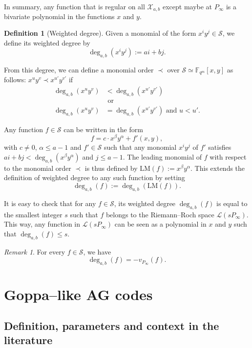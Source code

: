 \documentclass[lettersize,journal]{IEEEtran}
\theoremstyle{plain}
\theoremstyle{definition}
\newtheorem{definition}[thm]{Definition}
\theoremstyle{remark}
\newtheorem{remark}[thm]{Remark}
\newcommand{\calL}{\mathcal{L}}
\newcommand{\calS}{\mathcal{S}}
\newcommand{\calX}{\mathcal{X}}
\newcommand{\fqm}{\mathbb{F}_{q^m}}
\newcommand{\degab}[1]{\deg_{a,b}\left(#1\right)}
\begin{document}
	In summary, any function that is regular on all $\calX_{a,b}$ except maybe at $P_\infty$ is a bivariate polynomial in the functions $x$ and $y$. 
	
	\begin{definition}[Weighted degree] 
		Given a monomial of the form $x^iy^j \in \calS$, we define its weighted degree by
		\[ \degab{x^iy^j} := ai+bj.\]
		
		From this degree, we can define a monomial order $\prec$ over $\calS \simeq \fqm[x,y]$ as follows: $x^uy^v \prec x^{u'}y^{v'}$ if
		\begin{equation}\label{eq:def_mon_order}
			\begin{aligned}			
			\degab{x^uy^v} &< \degab{x^{u'}y^{v'}} \\
			&\text{ or }\\
			 \degab{x^uy^v} &= \degab{x^{u'}y^{v'}}  \text{ and } u < u'.
			 \end{aligned}
		\end{equation}
		
		Any function $f \in \calS$ can be written in the form $$f = c \cdot x^{\beta}y^{\alpha} + f'(x,y),$$
		with $c \neq 0$, $\alpha \leq a-1$ and $f' \in \calS$ such that any monomial $x^iy^j$ of $f'$ satisfies $ai+bj < \degab{x^{\beta}y^{\alpha}}$ and $j \leq a-1$. The leading monomial of $f$ with respect to the monomial order $\prec$ is thus defined by $\mathrm{LM}(f) := x^{\beta}y^{\alpha}$. This extends the definition of weighted degree to any such function by setting 
		\[\degab{f} := \degab{\mathrm{LM}(f)}.\]
	\end{definition}
	
	It is easy to check that for any $f \in \calS$, its weighted degree $\degab{f}$ is equal to the smallest integer $s$ such that $f$ belongs to the Riemann--Roch space $\calL(sP_{\infty})$.
	This way, any function in $\calL(sP_\infty)$ can be seen as a polynomial in $x$ and $y$ such that $\degab{f}\leq s$. 
	\begin{remark} \label{rq:link_degab_valuation}
		For every $f \in \calS$, we have 
\[		\degab{f}=-v_{P_\infty}(f).\]
	\end{remark}
	
	\section{Goppa--like AG codes}\label{sec:Goppa}
	\subsection{Definition, parameters and context in the literature}\label{subsec:def-Goppa}
	
\end{document}
